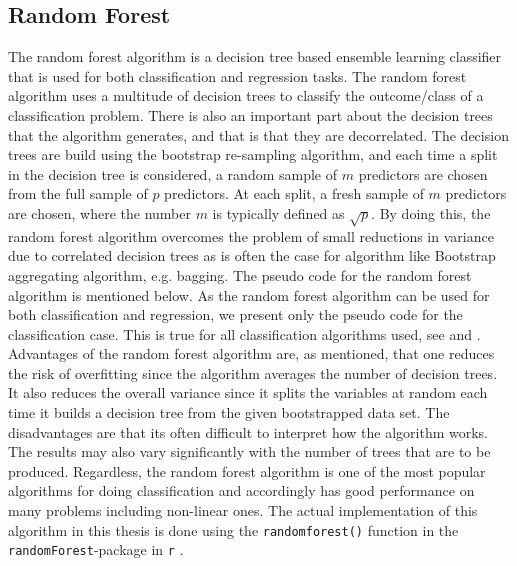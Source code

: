 \documentclass[../thesis.tex]{subfiles}
\begin{document}
\subsection{Random Forest}
\label{subsec:random_forr}

\noindent The random forest algorithm \citep{ho1995random} is a decision tree based ensemble learning classifier that is used for both classification and regression tasks. The random forest algorithm uses a multitude of decision trees to classify the outcome/class of a classification problem. There is also an important part about the decision trees that the algorithm generates, and that is that they are decorrelated. The decision trees are build using the bootstrap re-sampling algorithm, and each time a split in the decision tree is considered, a random sample of $m$ predictors are chosen from the full sample of $p$ predictors. At each split, a fresh sample of $m$ predictors are chosen, where the number $m$ is typically defined as $\sqrt{p}$. By doing this, the random forest algorithm overcomes the problem of small reductions in variance due to correlated decision trees as is often the case for algorithm like Bootstrap aggregating algorithm, e.g. bagging. The pseudo code for the random forest algorithm is mentioned below. As the random forest algorithm can be used for both classification and regression, we present only the pseudo code for the classification case. This is true for all classification algorithms used, see \citep{friedman2009elements} and \citep{james2013introduction}.\\
\indent Advantages of the random forest algorithm are, as mentioned, that one reduces the risk of overfitting since the algorithm averages the number of decision trees. It also reduces the overall variance since it splits the variables at random each time it builds a decision tree from the given bootstrapped data set. The disadvantages are that its often difficult to interpret how the algorithm works. The results may also vary significantly with the number of trees that are to be produced. Regardless, the random forest algorithm is one of the most popular algorithms for doing classification and accordingly has good performance on many problems including non-linear ones. The actual implementation of this algorithm in this thesis is done using the \texttt{randomforest()} function in the \texttt{randomForest}-package in \texttt{r} \citep{randomforest}.\\
\end{document}
